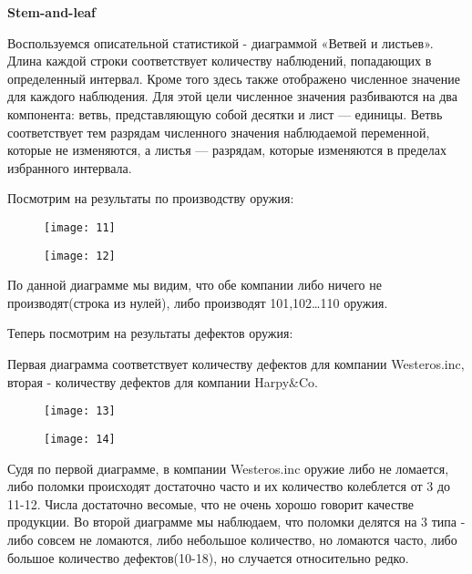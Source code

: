 \documentclass{beamer}
\begin{document}
\begin{frame}
\textbf{Stem-and-leaf}

Воспользуемся описательной статистикой - диаграммой «Ветвей и листьев». 
Длина каждой строки соответствует количеству наблюдений, попадающих в определенный интервал. Кроме того здесь также отображено численное значение для каждого наблюдения. Для этой цели численное значения разбиваются на два компонента: ветвь, представляющую собой десятки и лист — единицы. Ветвь соответствует тем разрядам численного значения наблюдаемой переменной, которые не изменяются, а листья — разрядам, которые изменяются в пределах избранного интервала.
\end{frame}

\begin{frame}
Посмотрим на результаты по производству оружия:
\begin{figure}[t]
\centering
\texttt{[image: 11]}
\end{figure}

\begin{figure}[t]
\centering
\texttt{[image: 12]}
\end{figure}
\end{frame}

\begin{frame}
По данной диаграмме мы видим, что обе компании либо ничего не производят(строка из нулей), либо производят 101,102…110 оружия.

Теперь посмотрим на результаты дефектов оружия:

Первая диаграмма соответствует количеству дефектов для компании Westeros.inc, вторая - количеству дефектов для компании Harpy\&Co.
\end{frame}

\begin{frame}
\begin{figure}[t]
	\centering
	\texttt{[image: 13]}
\end{figure}

\begin{figure}[t]
	\centering
	\texttt{[image: 14]}
\end{figure}
\end{frame}

\begin{frame}
Судя по первой диаграмме, в компании Westeros.inc оружие либо не ломается, либо поломки происходят достаточно часто и их количество колеблется от 3 до 11-12. Числа достаточно весомые, что не очень хорошо говорит качестве продукции.
Во второй диаграмме мы наблюдаем, что поломки делятся на 3 типа - либо совсем не ломаются, либо небольшое количество, но ломаются часто, либо большое количество дефектов(10-18), но случается относительно редко.

\end{frame}
\end{document}
